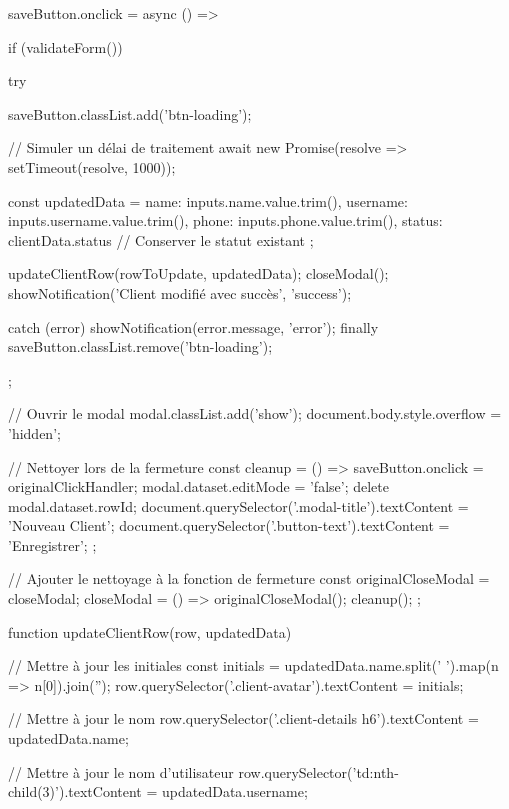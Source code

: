 {{        saveButton.onclick = async () => {
            if (validateForm()) {
                try {
                    saveButton.classList.add('btn-loading');
                    
                    // Simuler un délai de traitement
                    await new Promise(resolve => setTimeout(resolve, 1000));

                    const updatedData = {
                        name: inputs.name.value.trim(),
                        username: inputs.username.value.trim(),
                        phone: inputs.phone.value.trim(),
                        status: clientData.status // Conserver le statut existant
                    };

                    updateClientRow(rowToUpdate, updatedData);
                    closeModal();
                    showNotification('Client modifié avec succès', 'success');
                } catch (error) {
                    showNotification(error.message, 'error');
                } finally {
                    saveButton.classList.remove('btn-loading');
                }
            }
        };

        // Ouvrir le modal
        modal.classList.add('show');
        document.body.style.overflow = 'hidden';

        // Nettoyer lors de la fermeture
        const cleanup = () => {
            saveButton.onclick = originalClickHandler;
            modal.dataset.editMode = 'false';
            delete modal.dataset.rowId;
            document.querySelector('.modal-title').textContent = 'Nouveau Client';
            document.querySelector('.button-text').textContent = 'Enregistrer';
        };

        // Ajouter le nettoyage à la fonction de fermeture
        const originalCloseModal = closeModal;
        closeModal = () => {
            originalCloseModal();
            cleanup();
        };
    }

    function updateClientRow(row, updatedData) {
        // Mettre à jour les initiales
        const initials = updatedData.name.split(' ').map(n => n[0]).join('');
        row.querySelector('.client-avatar').textContent = initials;
        
        // Mettre à jour le nom
        row.querySelector('.client-details h6').textContent = updatedData.name;
        
        // Mettre à jour le nom d'utilisateur
        row.querySelector('td:nth-child(3)').textContent = updatedData.username;
        
}}
